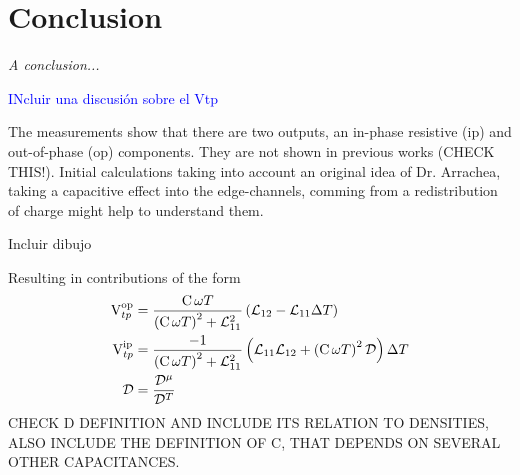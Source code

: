 \chapter{Conclusion}
\label{ch:conclusion}

\emph{A conclusion...}

\textcolor{blue}{INcluir una discusión sobre el Vtp}

The measurements show that there are two outputs, an in-phase resistive (ip) and out-of-phase (op) components. They are not shown in previous works (CHECK THIS!). Initial calculations taking into account an original idea of Dr. Arrachea, taking a capacitive effect into the edge-channels, comming from a redistribution of charge might help to understand them.

Incluir dibujo

Resulting in contributions of the form
\begin{align}
    \text{V}_{tp}^{\text{op}} &= \frac{\text{C} \,  \omega T}{\left(\text{C} \,  \omega T \right)^2 +  \mathcal{L}_{ 11 } ^2} \left(   \mathcal{L}_{ 12 }  -  \mathcal{L}_{ 11 }  \Delta T \right)\\
    \text{V}_{tp}^{\text{ip}} &= \frac{-1}{\left( \text{C} \,  \omega T \right)^2 +  \mathcal{L}_{ 11 } ^2} \left(   \mathcal{L}_{ 11 }   \mathcal{L}_{ 12 }  + \left( \text{C} \,  \omega T \right)^2 \mathcal{D} \right) \Delta T \\
    \mathcal{D} &= \frac{\mathcal{D}^{\mu}}{\mathcal{D}^{T}}
\end{align}
%
CHECK D DEFINITION AND INCLUDE ITS RELATION TO DENSITIES, ALSO INCLUDE THE DEFINITION OF C, THAT DEPENDS ON SEVERAL OTHER CAPACITANCES.
